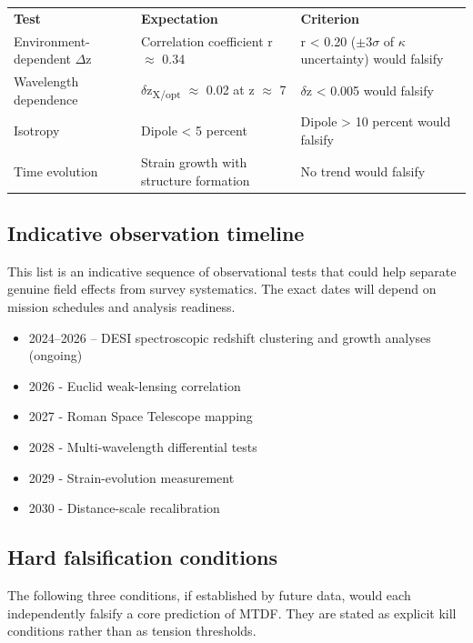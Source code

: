 \documentclass[11pt,a4paper]{article}
\begin{document}
\begin{table}[H]
\centering
\footnotesize
\begin{tabularx}{\linewidth}{l>{\RaggedRight\arraybackslash}X>{\RaggedRight\arraybackslash}X}
\toprule
\textbf{Test} & \textbf{Expectation} & \textbf{Criterion} \tabularnewline
Environment-dependent $\Delta$z & Correlation coefficient r $\approx$ 0.34 & r < 0.20 ($\pm$3$\sigma$ of $\kappa$ uncertainty) would falsify \tabularnewline
Wavelength dependence & $\delta$z\textsubscript{X/\allowbreak{}opt} $\approx$ 0.02 at z $\approx$ 7 & $\delta$z < 0.005 would falsify \tabularnewline
Isotropy & Dipole < 5 percent & Dipole > 10 percent would falsify \tabularnewline
Time evolution & Strain growth with structure formation & No trend would falsify \tabularnewline
\bottomrule
\end{tabularx}
\end{table}

\subsection{Indicative observation timeline}
This list is an indicative sequence of observational tests that could help separate genuine field effects from survey systematics. The exact dates will depend on mission schedules and analysis readiness.

\begin{itemize}
  \item 2024--2026 -- DESI spectroscopic redshift clustering and growth analyses (ongoing)
  \item 2026 - Euclid weak-lensing correlation
  \item 2027 - Roman Space Telescope mapping
  \item 2028 - Multi-wavelength differential tests
  \item 2029 - Strain-evolution measurement
  \item 2030 - Distance-scale recalibration
\end{itemize}

\subsection{Hard falsification conditions}
The following three conditions, if established by future data, would each independently falsify a core prediction of MTDF. They are stated as explicit kill conditions rather than as tension thresholds.
\end{document}
